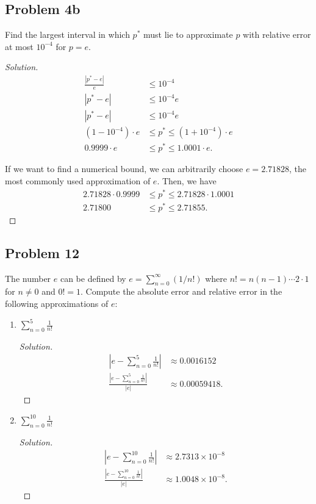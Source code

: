 \documentclass{article}
\begin{document}
\subsection*{Problem 4b}
Find the largest interval in which $p^*$ must lie to approximate $p$ with relative error at most 
$10^{-4}$ for $p = e$.
\begin{proof}[Solution]
    \begin{align*}
        \frac{|p^*-e|}{e} & \le 10^{-4} \\
        |p^*-e| & \le 10^{-4}e \\
        |p^* - e| & \le 10^{-4}e \\
        (1-10^{-4})\cdot e & \le p^* \le (1+10^{-4})\cdot e \\
        0.9999\cdot e & \le p^* \le 1.0001\cdot e.
    \end{align*}

    If we want to find a numerical bound, we can arbitrarily choose $e = 2.71828$, the most commonly 
    used approximation of $e$. Then, we have 
    \begin{align*}
        2.71828\cdot 0.9999 & \le p^* \le 2.71828\cdot 1.0001 \\
        2.71800 & \le p^* \le 2.71855.
    \end{align*}

\end{proof}

\subsection*{Problem 12}
The number $e$ can be defined by $e = \sum^\infty_{n=0}(1/n!)$ where 
$n! = n(n-1)\cdots 2\cdot 1$
for $n\neq 0$ and $0! = 1$.
Compute the absolute error and relative error in the following approximations of $e$:
\begin{enumerate}[label=\alph*.]
    \item $\sum\limits^5_{n=0}\frac{1}{n!}$
    \begin{proof}[Solution]
        \begin{align*}
            |e - \sum\limits_{n=0}^{5}\frac{1}{n!}| & \approx 0.0016152 \\
            \frac{|e - \sum\limits_{n=0}^{5}\frac{1}{n!}|}{|e|} & \approx 0.00059418.
        \end{align*}
    \end{proof}
    
    \item $\sum\limits^{10}_{n=0}\frac{1}{n!}$
    \begin{proof}[Solution]
        \begin{align*}
            |e - \sum\limits_{n=0}^{10}\frac{1}{n!}| & \approx 2.7313 \times 10^{-8} \\
            \frac{|e - \sum\limits_{n=0}^{10}\frac{1}{n!}|}{|e|} & \approx 1.0048 \times 10^{-8}.
        \end{align*}
    \end{proof}
\end{enumerate}
\end{document}
